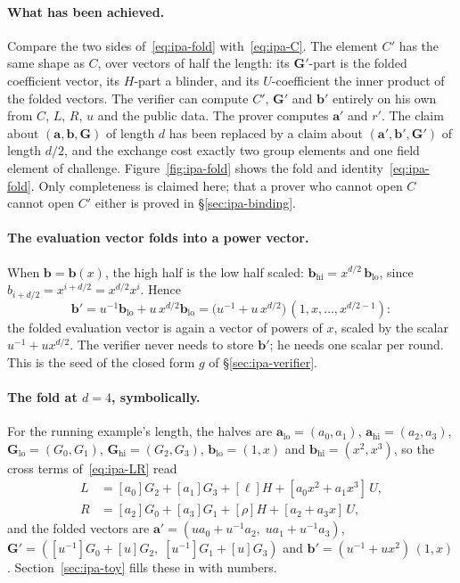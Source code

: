 \documentclass[11pt,a4paper]{article}
\theoremstyle{definition}
\begin{document}
\paragraph{What has been achieved.}
Compare the two sides of~\eqref{eq:ipa-fold} with~\eqref{eq:ipa-C}. The
element $C'$ has the same shape as $C$, over vectors of half the length:
its $\mathbf G'$-part is the folded coefficient vector, its $H$-part a
blinder, and its $U$-coefficient the inner product of the folded vectors.
The verifier can compute $C'$, $\mathbf G'$ and $\mathbf b'$ entirely on
his own from $C$, $L$, $R$, $u$ and the public data. The prover computes
$\mathbf a'$ and $r'$. The claim about $(\mathbf a, \mathbf b, \mathbf G)$
of length $d$ has been replaced by a claim about
$(\mathbf a', \mathbf b', \mathbf G')$ of length $d/2$, and the exchange
cost exactly two group elements and one field element of challenge.
Figure~\ref{fig:ipa-fold} shows the fold and
identity~\eqref{eq:ipa-fold}. Only completeness is claimed here; that a
prover who cannot open $C$ cannot open $C'$ either is proved in
\S\ref{sec:ipa-binding}.

\paragraph{The evaluation vector folds into a power vector.}
When $\mathbf b = \mathbf b(x)$, the high half is the low half scaled:
$\mathbf b_{\mathrm{hi}} = x^{d/2}\,\mathbf b_{\mathrm{lo}}$, since
$b_{i + d/2} = x^{i + d/2} = x^{d/2} x^{i}$. Hence
\[
\mathbf b' = u^{-1}\mathbf b_{\mathrm{lo}} + u\,x^{d/2}\mathbf b_{\mathrm{lo}}
 = \bigl(u^{-1} + u\,x^{d/2}\bigr)\,(1, x, \dots, x^{d/2 - 1}) :
\]
the folded evaluation vector is again a vector of powers of $x$, scaled
by the scalar $u^{-1} + u x^{d/2}$. The verifier never needs to store
$\mathbf b'$; he needs one scalar per round. This is the seed of the
closed form $g$ of \S\ref{sec:ipa-verifier}.

\paragraph{The fold at $d = 4$, symbolically.}
For the running example's length, the halves are
$\mathbf a_{\mathrm{lo}} = (a_0, a_1)$, $\mathbf a_{\mathrm{hi}} = (a_2,
a_3)$, $\mathbf G_{\mathrm{lo}} = (G_0, G_1)$, $\mathbf G_{\mathrm{hi}} =
(G_2, G_3)$, $\mathbf b_{\mathrm{lo}} = (1, x)$ and
$\mathbf b_{\mathrm{hi}} = (x^2, x^3)$, so the cross terms
of~\eqref{eq:ipa-LR} read
\begin{align*}
L &= [a_0]G_2 + [a_1]G_3 + [\ell]H + [a_0 x^2 + a_1 x^3]\,U, \\
R &= [a_2]G_0 + [a_3]G_1 + [\rho]H + [a_2 + a_3 x]\,U,
\end{align*}
and the folded vectors are $\mathbf a' = (u a_0 + u^{-1} a_2,\; u a_1 +
u^{-1} a_3)$, $\mathbf G' = ([u^{-1}]G_0 + [u]G_2,\; [u^{-1}]G_1 +
[u]G_3)$ and $\mathbf b' = (u^{-1} + u x^2)\,(1, x)$.
Section~\ref{sec:ipa-toy} fills these in with numbers.
\end{document}
